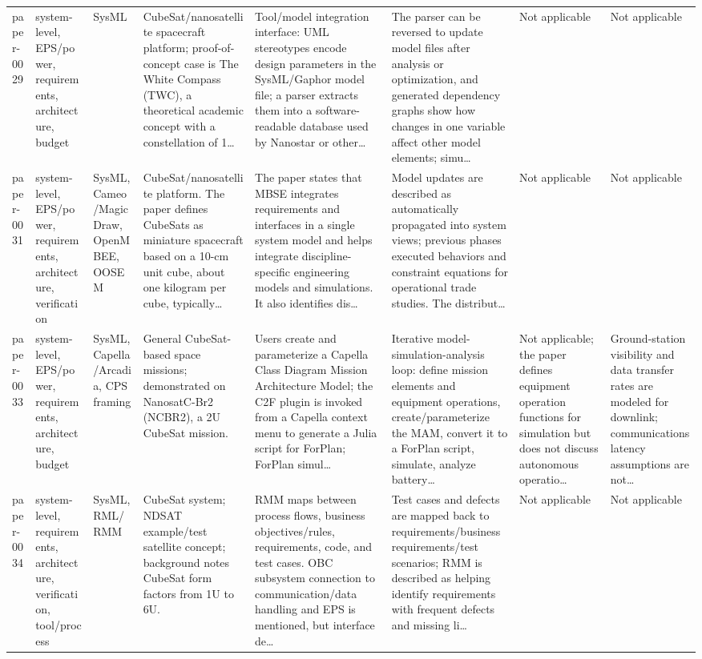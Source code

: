 \documentclass[10pt]{article}
\begin{document}
\begin{landscape}
\begin{longtable}{p{1.1cm}p{3.1cm}p{2.5cm}p{3.3cm}p{4.0cm}p{3.5cm}p{2.8cm}p{2.8cm}}
paper-0029 & system-level, EPS/power, requirements, architecture, budget & SysML & CubeSat/nanosatellite spacecraft platform; proof-of-concept case is The White Compass (TWC), a theoretical academic concept with a constellation of 1… & Tool/model integration interface: UML stereotypes encode design parameters in the SysML/Gaphor model file; a parser extracts them into a software-readable database used by Nanostar or other… & The parser can be reversed to update model files after analysis or optimization, and generated dependency graphs show how changes in one variable affect other model elements; simu… & Not applicable & Not applicable \\
paper-0031 & system-level, EPS/power, requirements, architecture, verification & SysML, Cameo/MagicDraw, OpenMBEE, OOSEM & CubeSat/nanosatellite platform. The paper defines CubeSats as miniature spacecraft based on a 10-cm unit cube, about one kilogram per cube, typically… & The paper states that MBSE integrates requirements and interfaces in a single system model and helps integrate discipline-specific engineering models and simulations. It also identifies dis… & Model updates are described as automatically propagated into system views; previous phases executed behaviors and constraint equations for operational trade studies. The distribut… & Not applicable & Not applicable \\
paper-0033 & system-level, EPS/power, requirements, architecture, budget & SysML, Capella/Arcadia, CPS framing & General CubeSat-based space missions; demonstrated on NanosatC-Br2 (NCBR2), a 2U CubeSat mission. & Users create and parameterize a Capella Class Diagram Mission Architecture Model; the C2F plugin is invoked from a Capella context menu to generate a Julia script for ForPlan; ForPlan simul… & Iterative model-simulation-analysis loop: define mission elements and equipment operations, create/parameterize the MAM, convert it to a ForPlan script, simulate, analyze battery… & Not applicable; the paper defines equipment operation functions for simulation but does not discuss autonomous operatio… & Ground-station visibility and data transfer rates are modeled for downlink; communications latency assumptions are not… \\
paper-0034 & system-level, requirements, architecture, verification, tool/process & SysML, RML/RMM & CubeSat system; NDSAT example/test satellite concept; background notes CubeSat form factors from 1U to 6U. & RMM maps between process flows, business objectives/rules, requirements, code, and test cases. OBC subsystem connection to communication/data handling and EPS is mentioned, but interface de… & Test cases and defects are mapped back to requirements/business requirements/test scenarios; RMM is described as helping identify requirements with frequent defects and missing li… & Not applicable & Not applicable \\

\end{longtable}
\end{landscape}
\end{document}

